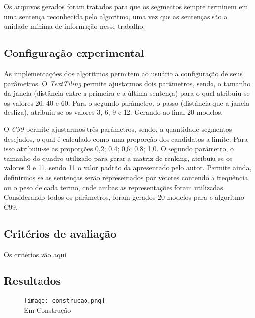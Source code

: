 Os arquivos gerados foram tratados para que os segmentos sempre terminem em uma sentença reconhecida pelo algoritmo, uma vez que as sentenças são a unidade mínima de informação nesse trabalho.
  

\subsection{Configuração experimental}
	\label{subsec:configuracaoexperimental}

As implementações dos algoritmos permitem ao usuário a configuração de seus parâmetros. 
%
O \textit{TextTiling} permite ajustarmos dois parâmetros, sendo, o tamanho da janela (distância entre a primeira e a última sentença) para o qual atribuiu-se os valores 20, 40 e 60. Para o segundo parâmetro, o passo (distância que a janela desliza), atribuiu-se os valores 3, 6, 9 e 12. Gerando ao final 20 modelos.
%

O \textit{C99} permite ajustarmos três parâmetros, sendo, a quantidade segmentos desejados, o qual é calculado como uma proporção dos candidatos a limite. Para isso atribuiu-se as proporções {0,2; 0,4; 0,6; 0,8; 1,0}. O segundo parâmetro, o tamanho do quadro utilizado para gerar a matriz de ranking, atribuiu-se os valores 9 e 11, sendo 11 o valor padrão da apresentado pelo autor. Permite ainda, definirmos se as sentenças serão representados por vetores contendo a frequência ou o peso de cada termo, onde ambas as representações foram utilizadas.
%
 Considerando todos os parâmetros, foram gerados 20 modelos para o algoritmo C99.%


\subsection{Critérios de avaliação}


Os critérios vão aqui 



\subsection{Resultados}
	\label{subsec:resultados}
	
	
  \begin{figure}[!h]
	\centering
	\texttt{[image: construcao.png]}
	\\Em Construção
	\label{fig:emconstrucao}
  \end{figure}

